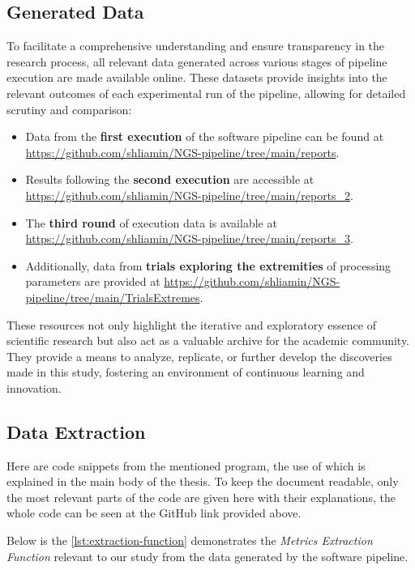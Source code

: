 \subsection{Generated Data}\label{sec:generated_data}

To facilitate a comprehensive understanding and ensure transparency in the research process, all relevant data generated across various stages of pipeline execution are made available online. These datasets provide insights into the relevant outcomes of each experimental run of the pipeline, allowing for detailed scrutiny and comparison:

\begin{itemize}
    \item Data from the \textbf{first execution} of the software pipeline can be found at \url{https://github.com/shliamin/NGS-pipeline/tree/main/reports}.
    \item Results following the \textbf{second execution} are accessible at \url{https://github.com/shliamin/NGS-pipeline/tree/main/reports_2}.
    \item The \textbf{third round} of execution data is available at \url{https://github.com/shliamin/NGS-pipeline/tree/main/reports_3}.
    \item Additionally, data from \textbf{trials exploring the extremities} of processing parameters are provided at \url{https://github.com/shliamin/NGS-pipeline/tree/main/TrialsExtremes}.
\end{itemize}

These resources not only highlight the iterative and exploratory essence of scientific research but also act as a valuable archive for the academic community. They provide a means to analyze, replicate, or further develop the discoveries made in this study, fostering an environment of continuous learning and innovation.

\subsection{Data Extraction}\label{sec:data_extraction}

Here are code snippets from the mentioned program, the use of which is explained in the main body of the thesis. To keep the document readable, only the most relevant parts of the code are given here with their explanations, the whole code can be seen at the GitHub link provided above.

Below is the \autoref{lst:extraction-function} demonstrates the \textit{Metrics Extraction Function} relevant to our study from the data generated by the software pipeline. 

